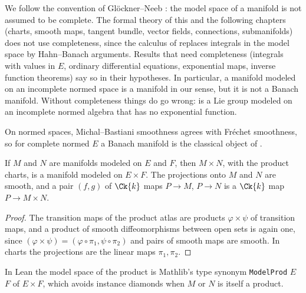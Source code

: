 \begin{remark}
  \label{rem:man-complete}
  We follow the convention of Glöckner--Neeb \cite[\S5.7]{GN26}: the model space of a manifold
  is not assumed to be complete. The formal theory of this and the following chapters (charts,
  smooth maps, tangent bundle, vector fields, connections, submanifolds) does not use
  completeness, since the calculus of \cite{LCA} replaces integrals in the model space by
  Hahn--Banach arguments. Results that need completeness (integrals with values in $E$,
  ordinary differential equations, exponential maps, inverse function theorems) say so in their
  hypotheses. In particular, a manifold modeled on an incomplete normed space is a manifold in
  our sense, but it is not a Banach manifold. Without completeness things do go wrong:
  \cite[Example 5.6.8]{GN26} is a Lie group modeled on an incomplete normed algebra that has no
  exponential function.
\end{remark}

On normed spaces, Michal--Bastiani smoothness agrees with Fréchet smoothness, so for complete
normed $E$ a Banach manifold is the classical object of \cite{Lan99}.

\begin{proposition}[Products]
  \label{prop:man-product}
  \leanok
  If $M$ and $N$ are manifolds modeled on $E$ and $F$, then $M \times N$, with the product
  charts, is a manifold modeled on $E \times F$. The projections onto $M$ and $N$ are smooth, and
  a pair $(f, g)$ of $\Ck{k}$ maps $P \to M$, $P \to N$ is a $\Ck{k}$ map $P \to M \times N$.
\end{proposition}

\begin{proof}
  \leanok
  The transition maps of the product atlas are products $\varphi \times \psi$ of transition
  maps, and a product of smooth diffeomorphisms between open sets is again one, since
  $(\varphi \times \psi) = (\varphi \circ \pi_1, \psi \circ \pi_2)$ and pairs of smooth maps are
  smooth. In charts the projections are the linear maps $\pi_1, \pi_2$.
\end{proof}

In Lean the model space of the product is Mathlib's type synonym \texttt{ModelProd} $E$ $F$ of
$E \times F$, which avoids instance diamonds when $M$ or $N$ is itself a product.

